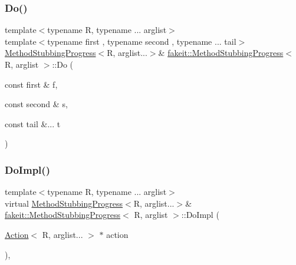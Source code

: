 \mbox{\label{structfakeit_1_1MethodStubbingProgress_a157561400e37da65c5b48f4466fc603c}} 
\subsubsection{\texorpdfstring{Do()}{Do()}\hspace{0.1cm}{\footnotesize\ttfamily [27/27]}}
{\footnotesize\ttfamily template$<$typename R, typename ... arglist$>$ \\
template$<$typename first , typename second , typename ... tail$>$ \\
\mbox{\hyperlink{structfakeit_1_1MethodStubbingProgress}{Method\+Stubbing\+Progress}}$<$R, arglist...$>$\& \mbox{\hyperlink{structfakeit_1_1MethodStubbingProgress}{fakeit\+::\+Method\+Stubbing\+Progress}}$<$ R, arglist $>$\+::Do (\begin{DoxyParamCaption}\item[{const first \&}]{f,  }\item[{const second \&}]{s,  }\item[{const tail \&...}]{t }\end{DoxyParamCaption})\hspace{0.3cm}{\ttfamily [inline]}}

\mbox{\label{structfakeit_1_1MethodStubbingProgress_a73218fd396f0096f93462f2d4656c509}} 
\subsubsection{\texorpdfstring{DoImpl()}{DoImpl()}\hspace{0.1cm}{\footnotesize\ttfamily [1/9]}}
{\footnotesize\ttfamily template$<$typename R, typename ... arglist$>$ \\
virtual \mbox{\hyperlink{structfakeit_1_1MethodStubbingProgress}{Method\+Stubbing\+Progress}}$<$R, arglist...$>$\& \mbox{\hyperlink{structfakeit_1_1MethodStubbingProgress}{fakeit\+::\+Method\+Stubbing\+Progress}}$<$ R, arglist $>$\+::Do\+Impl (\begin{DoxyParamCaption}\item[{\mbox{\hyperlink{structfakeit_1_1Action}{Action}}$<$ R, arglist... $>$ $\ast$}]{action }\end{DoxyParamCaption})\hspace{0.3cm}{\ttfamily [protected]}, {}}




